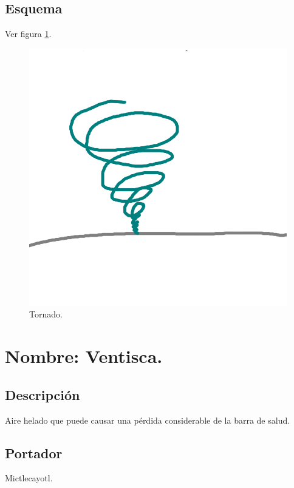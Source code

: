 \subsection{Esquema}
			Ver figura \ref{fig:tornado}.
			\begin{figure}
				\centering
				\includegraphics[height=0.2 \textheight]{Imagenes/tornado}
				\caption{Tornado.}
				\label{fig:tornado}
			\end{figure}

\section{Nombre: Ventisca.} \label{ventisca}
\subsection{Descripción}
Aire helado que puede causar una pérdida considerable de la barra de salud.
\subsection{Portador}
Mictlecayotl.

